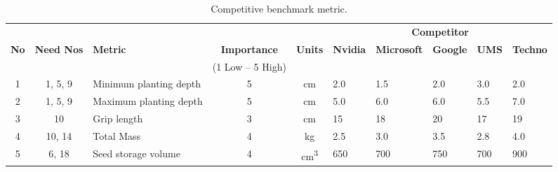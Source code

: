 \begin{landscape} %
    \thispagestyle{plain} %
    \begin{table}[h]
        \centering
        \caption{Competitive benchmark metric.}
        \small %
        \renewcommand{\arraystretch}{1.2} %
        \setlength{\tabcolsep}{5pt} %

        \begin{tabular}{c c l c c p{2cm} p{2cm} p{2cm} p{2cm} p{2cm}}
            \toprule
            \multicolumn{3}{c}{} & \multicolumn{2}{c}{} & \multicolumn{5}{c}{\textbf{Competitor}} \\
            \cmidrule(lr){6-10}
            \textbf{No} & \textbf{Need Nos} & \textbf{Metric} & \textbf{Importance} & \textbf{Units} & \textbf{Nvidia} & \textbf{Microsoft} & \textbf{Google} & \textbf{UMS} & \textbf{Techno} \\
            & & & (1 Low – 5 High) & & & & & & \\
            \midrule
            1  & 1, 5, 9  & Minimum planting depth & 5 & cm  & 2.0 & 1.5 & 2.0 & 3.0 & 2.0 \\
            2  & 1, 5, 9  & Maximum planting depth & 5 & cm  & 5.0 & 6.0 & 6.0 & 5.5 & 7.0 \\
            3  & 10       & Grip length            & 3 & cm  & 15  & 18  & 20  & 17  & 19  \\
            4  & 10, 14   & Total Mass             & 4 & kg  & 2.5 & 3.0 & 3.5 & 2.8 & 4.0 \\
            5  & 6, 18    & Seed storage volume    & 4 & cm\textsuperscript{3} & 650 & 700 & 750 & 700 & 900 \\
            \bottomrule
        \end{tabular}
    \end{table}
\end{landscape} %